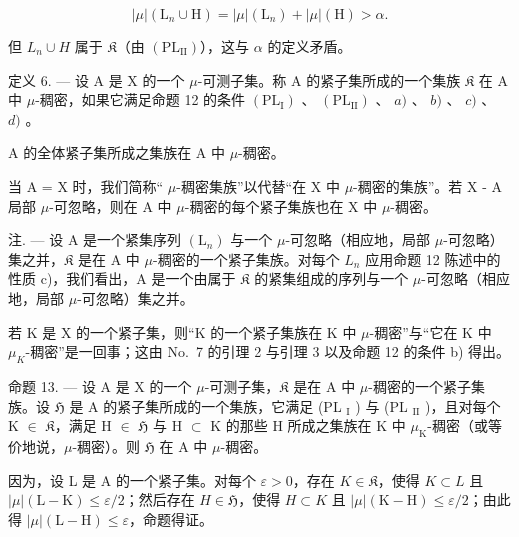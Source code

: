 \[
| \mu | (\mathrm{L} _ {n} \cup \mathrm{H}) = | \mu | (\mathrm{L} _ {n}) + | \mu | (\mathrm{H}) > \alpha .
\]

但 \(L_{n} \cup H\) 属于 \(\mathfrak{K}\)（由 \((\mathrm{PL}_{\mathrm{II}})\)），这与 \(\alpha\) 的定义矛盾。

定义 6. --- 设 A 是 X 的一个 \(\mu\)-可测子集。称 A 的紧子集所成的一个集族 \(\mathfrak{K}\) 在 A 中 \(\mu\)-稠密，如果它满足命题 12 的条件 \((\mathrm{PL}_{\mathrm{I}})\) 、 \((\mathrm{PL}_{\mathrm{II}})\) 、 \(a)\) 、 \(b)\) 、 \(c)\) 、 \(d)\) 。

A 的全体紧子集所成之集族在 A 中 \(\mu\)-稠密。

当 A = X 时，我们简称“ \(\mu\)-稠密集族”以代替“在 X 中 \(\mu\)-稠密的集族”。若 X - A 局部 \(\mu\)-可忽略，则在 A 中 \(\mu\)-稠密的每个紧子集族也在 X 中 \(\mu\)-稠密。

注. --- 设 A 是一个紧集序列 \((\mathrm{L}_{n})\) 与一个 \(\mu\)-可忽略（相应地，局部 \(\mu\)-可忽略）集之并，\(\mathfrak{K}\) 是在 A 中 \(\mu\)-稠密的一个紧子集族。对每个 \(L_{n}\) 应用命题 12 陈述中的性质 c)，我们看出，A 是一个由属于 \(\mathfrak{K}\) 的紧集组成的序列与一个 \(\mu\)-可忽略（相应地，局部 \(\mu\)-可忽略）集之并。

若 K 是 X 的一个紧子集，则“K 的一个紧子集族在 K 中 \(\mu\)-稠密”与“它在 K 中 \(\mu_{K}\)-稠密”是一回事；这由 No.~7 的引理 2 与引理 3 以及命题 12 的条件 b) 得出。

命题 13. --- 设 A 是 X 的一个 \(\mu\)-可测子集，\(\mathfrak{K}\) 是在 A 中 \(\mu\)-稠密的一个紧子集族。设 \(\mathfrak{H}\) 是 A 的紧子集所成的一个集族，它满足 (PL \(_{\text{I}}\) ) 与 (PL \(_{\text{II}}\) )，且对每个 K \(\in\) \(\mathfrak{K}\)，满足 H \(\in\) \(\mathfrak{H}\) 与 H \(\subset\) K 的那些 H 所成之集族在 K 中 \(\mu_{\text{K}}\)-稠密（或等价地说，\(\mu\)-稠密）。则 \(\mathfrak{H}\) 在 A 中 \(\mu\)-稠密。

因为，设 L 是 A 的一个紧子集。对每个 \(\varepsilon > 0\)，存在 \(K \in \mathfrak{K}\)，使得 \(K \subset L\) 且 \(|\mu|(\mathrm{L} - \mathrm{K}) \leqslant \varepsilon/2\)；然后存在 \(H \in \mathfrak{H}\)，使得 \(H \subset K\) 且 \(|\mu|(\mathrm{K} - \mathrm{H}) \leqslant \varepsilon/2\)；由此得 \(|\mu|(\mathrm{L} - \mathrm{H}) \leqslant \varepsilon\)，命题得证。

